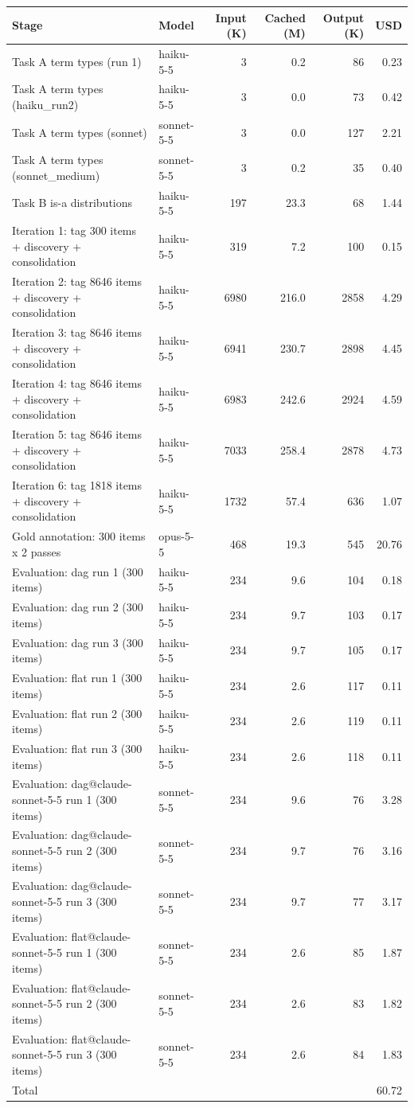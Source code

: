 \begin{tabular}{llrrrr}
\toprule
Stage & Model & Input (K) & Cached (M) & Output (K) & USD \\
\midrule
Task A term types (run 1) & haiku-5-5 & 3 & 0.2 & 86 & 0.23 \\
Task A term types (haiku\_run2) & haiku-5-5 & 3 & 0.0 & 73 & 0.42 \\
Task A term types (sonnet) & sonnet-5-5 & 3 & 0.0 & 127 & 2.21 \\
Task A term types (sonnet\_medium) & sonnet-5-5 & 3 & 0.2 & 35 & 0.40 \\
Task B is-a distributions & haiku-5-5 & 197 & 23.3 & 68 & 1.44 \\
Iteration 1: tag 300 items + discovery + consolidation & haiku-5-5 & 319 & 7.2 & 100 & 0.15 \\
Iteration 2: tag 8646 items + discovery + consolidation & haiku-5-5 & 6980 & 216.0 & 2858 & 4.29 \\
Iteration 3: tag 8646 items + discovery + consolidation & haiku-5-5 & 6941 & 230.7 & 2898 & 4.45 \\
Iteration 4: tag 8646 items + discovery + consolidation & haiku-5-5 & 6983 & 242.6 & 2924 & 4.59 \\
Iteration 5: tag 8646 items + discovery + consolidation & haiku-5-5 & 7033 & 258.4 & 2878 & 4.73 \\
Iteration 6: tag 1818 items + discovery + consolidation & haiku-5-5 & 1732 & 57.4 & 636 & 1.07 \\
Gold annotation: 300 items x 2 passes & opus-5-5 & 468 & 19.3 & 545 & 20.76 \\
Evaluation: dag run 1 (300 items) & haiku-5-5 & 234 & 9.6 & 104 & 0.18 \\
Evaluation: dag run 2 (300 items) & haiku-5-5 & 234 & 9.7 & 103 & 0.17 \\
Evaluation: dag run 3 (300 items) & haiku-5-5 & 234 & 9.7 & 105 & 0.17 \\
Evaluation: flat run 1 (300 items) & haiku-5-5 & 234 & 2.6 & 117 & 0.11 \\
Evaluation: flat run 2 (300 items) & haiku-5-5 & 234 & 2.6 & 119 & 0.11 \\
Evaluation: flat run 3 (300 items) & haiku-5-5 & 234 & 2.6 & 118 & 0.11 \\
Evaluation: dag@claude-sonnet-5-5 run 1 (300 items) & sonnet-5-5 & 234 & 9.6 & 76 & 3.28 \\
Evaluation: dag@claude-sonnet-5-5 run 2 (300 items) & sonnet-5-5 & 234 & 9.7 & 76 & 3.16 \\
Evaluation: dag@claude-sonnet-5-5 run 3 (300 items) & sonnet-5-5 & 234 & 9.7 & 77 & 3.17 \\
Evaluation: flat@claude-sonnet-5-5 run 1 (300 items) & sonnet-5-5 & 234 & 2.6 & 85 & 1.87 \\
Evaluation: flat@claude-sonnet-5-5 run 2 (300 items) & sonnet-5-5 & 234 & 2.6 & 83 & 1.82 \\
Evaluation: flat@claude-sonnet-5-5 run 3 (300 items) & sonnet-5-5 & 234 & 2.6 & 84 & 1.83 \\
\midrule
Total & & & & & 60.72 \\
\bottomrule
\end{tabular}
